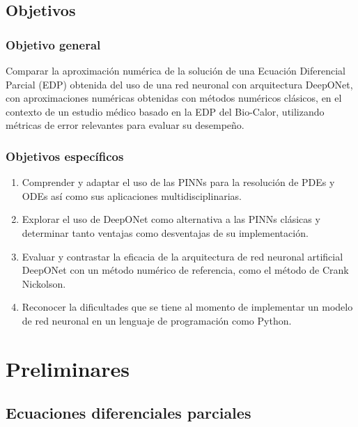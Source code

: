 \documentclass[
  spanish,
  us-letterpaper,
  DIV=11,
  numbers=noendperiod]{scrreprt}
\theoremstyle{plain}
\theoremstyle{definition}
\theoremstyle{remark}
\begin{document}

\chapter{Objetivos}\label{objetivos}

\section{Objetivo general}\label{objetivo-general}

Comparar la aproximación numérica de la solución de una Ecuación
Diferencial Parcial (EDP) obtenida del uso de una red neuronal con
arquitectura DeepONet, con aproximaciones numéricas obtenidas con
métodos numéricos clásicos, en el contexto de un estudio médico basado
en la EDP del Bio-Calor, utilizando métricas de error relevantes para
evaluar su desempeño.

\section{Objetivos específicos}\label{objetivos-especuxedficos}

\begin{enumerate}
\def\labelenumi{\arabic{enumi}.}
\item
  Comprender y adaptar el uso de las PINNs para la resolución de PDEs y
  ODEs así como sus aplicaciones multidisciplinarias.
\item
  Explorar el uso de DeepONet como alternativa a las PINNs clásicas y
  determinar tanto ventajas como desventajas de su implementación.
\item
  Evaluar y contrastar la eficacia de la arquitectura de red neuronal
  artificial DeepONet con un método numérico de referencia, como el
  método de Crank Nickolson.
\item
  Reconocer la dificultades que se tiene al momento de implementar un
  modelo de red neuronal en un lenguaje de programación como Python.
\end{enumerate}

\part{Preliminares}

\chapter{Ecuaciones diferenciales
parciales}\label{ecuaciones-diferenciales-parciales}
\end{document}
